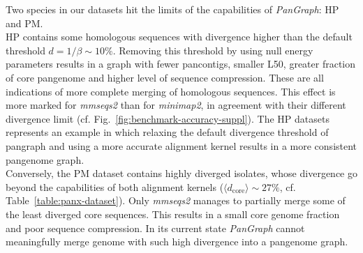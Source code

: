 \documentclass[aps,rmp,reprint,superscriptaddress,notitlepage,10pt,onecolumn]{revtex4-1}
\newcommand{\dcore}{\langle d_\text{core} \rangle}
\begin{document}
Two species in our datasets hit the limits of the capabilities of \textit{PanGraph}: HP and PM.\\
HP contains some homologous sequences with divergence higher than the default threshold $d = 1/\beta \sim 10\%$. Removing this threshold by using null energy parameters results in a graph with fewer pancontigs, smaller L50, greater fraction of core pangenome and higher level of sequence compression. These are all indications of more complete merging of homologous sequences. This effect is more marked for \textit{mmseqs2} than for \textit{minimap2}, in agreement with their different divergence limit (cf. Fig.~\ref{fig:benchmark-accuracy-suppl}). The HP datasets represents an example in which relaxing the default divergence threshold of pangraph and using a more accurate alignment kernel results in a more consistent pangenome graph.\\
Conversely, the PM dataset contains highly diverged isolates, whose divergence go beyond the capabilities of both alignment kernels ($\dcore \sim 27 \%$, cf. Table~\ref{table:panx-dataset}). Only \textit{mmseqs2} manages to partially merge some of the least diverged core sequences. This results in a small core genome fraction and poor sequence compression. In its current state \textit{PanGraph} cannot meaningfully merge genome with such high divergence into a pangenome graph.
\end{document}
